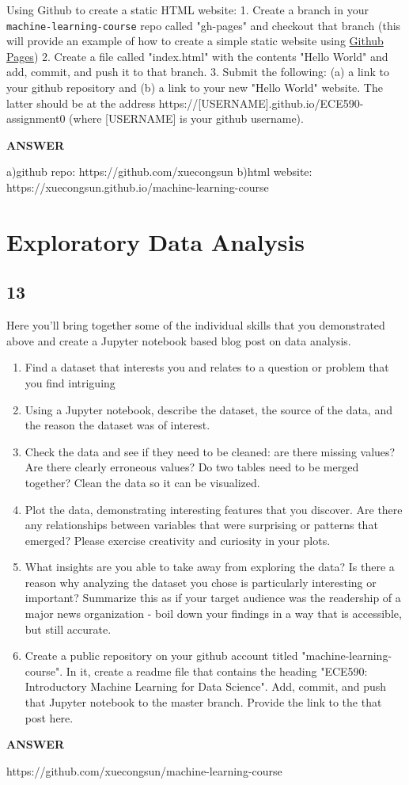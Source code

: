\documentclass[11pt]{article}
\providecommand{\tightlist}{%
      \setlength{\itemsep}{0pt}\setlength{\parskip}{0pt}}
\begin{document}
Using Github to create a static HTML website: 1. Create a branch in your
\texttt{machine-learning-course} repo called "gh-pages" and checkout
that branch (this will provide an example of how to create a simple
static website using \href{https://pages.github.com/}{Github Pages}) 2.
Create a file called "index.html" with the contents "Hello World" and
add, commit, and push it to that branch. 3. Submit the following: (a) a
link to your github repository and (b) a link to your new "Hello World"
website. The latter should be at the address
https://{[}USERNAME{]}.github.io/ECE590-assignment0 (where
{[}USERNAME{]} is your github username).

    \textbf{ANSWER}

    a)github repo: https://github.com/xuecongsun b)html website:
https://xuecongsun.github.io/machine-learning-course

    \section{Exploratory Data Analysis}\label{exploratory-data-analysis}

\subsection{13}\label{section}

Here you'll bring together some of the individual skills that you
demonstrated above and create a Jupyter notebook based blog post on data
analysis.

\begin{enumerate}
\def\labelenumi{\arabic{enumi}.}
\tightlist
\item
  Find a dataset that interests you and relates to a question or problem
  that you find intriguing
\item
  Using a Jupyter notebook, describe the dataset, the source of the
  data, and the reason the dataset was of interest.
\item
  Check the data and see if they need to be cleaned: are there missing
  values? Are there clearly erroneous values? Do two tables need to be
  merged together? Clean the data so it can be visualized.
\item
  Plot the data, demonstrating interesting features that you discover.
  Are there any relationships between variables that were surprising or
  patterns that emerged? Please exercise creativity and curiosity in
  your plots.
\item
  What insights are you able to take away from exploring the data? Is
  there a reason why analyzing the dataset you chose is particularly
  interesting or important? Summarize this as if your target audience
  was the readership of a major news organization - boil down your
  findings in a way that is accessible, but still accurate.
\item
  Create a public repository on your github account titled
  "machine-learning-course". In it, create a readme file that contains
  the heading "ECE590: Introductory Machine Learning for Data Science".
  Add, commit, and push that Jupyter notebook to the master branch.
  Provide the link to the that post here.
\end{enumerate}

    \textbf{ANSWER}

    https://github.com/xuecongsun/machine-learning-course


    
    
    
    
\end{document}
